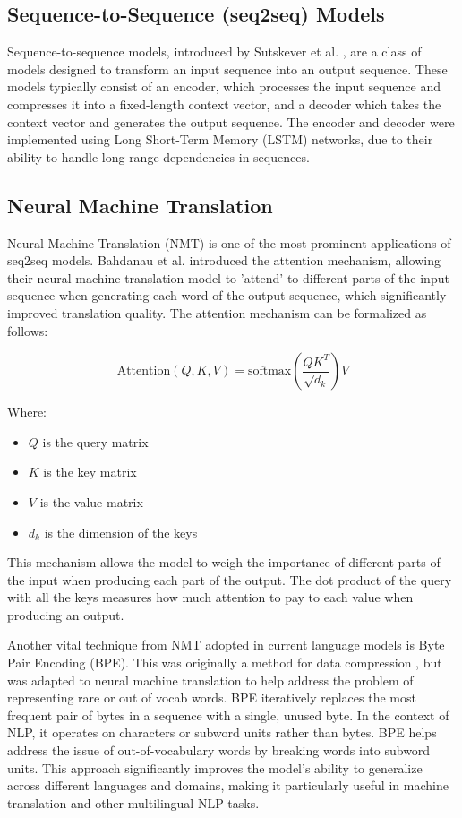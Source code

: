 \documentclass[a4paper, oneside]{discothesis}
\begin{document}
\subsection{Sequence-to-Sequence (seq2seq) Models}
Sequence-to-sequence models, introduced by Sutskever et al. \cite{sutskever2014sequence}, are a class of models designed to transform an input sequence into an output sequence. 
These models typically consist of an encoder, which processes the input sequence and compresses it into a fixed-length context vector, and a decoder which takes the context vector and generates the output sequence.
The encoder and decoder were implemented using Long Short-Term Memory (LSTM) networks, due to their ability to handle long-range dependencies in sequences.

\subsection{Neural Machine Translation}
Neural Machine Translation (NMT) is one of the most prominent applications of seq2seq models.
Bahdanau et al. \cite{bahdanau2014neural} introduced the attention mechanism, allowing their neural machine translation model to 'attend' to different parts of the input sequence when generating each word of the output sequence, which significantly improved translation quality.
The attention mechanism can be formalized as follows:

\begin{equation}
\text{Attention}(Q, K, V) = \text{softmax}\left(\frac{QK^T}{\sqrt{d_k}}\right)V
\end{equation}

Where:
\begin{itemize}
    \item $Q$ is the query matrix
    \item $K$ is the key matrix
    \item $V$ is the value matrix
    \item $d_k$ is the dimension of the keys
\end{itemize}

This mechanism allows the model to weigh the importance of different parts of the input when producing each part of the output. The dot product of the query with all the keys measures how much attention to pay to each value when producing an output.

Another vital technique from NMT adopted in current language models is Byte Pair Encoding (BPE). This was originally a method for data compression \cite{PhilipGage1994}, but was adapted to neural machine translation to help address the problem of representing rare or out of vocab words\cite{sennrich2015neural}. 
BPE iteratively replaces the most frequent pair of bytes in a sequence with a single, unused byte. In the context of NLP, it operates on characters or subword units rather than bytes. BPE helps address the issue of out-of-vocabulary words by breaking words into subword units. 
This approach significantly improves the model's ability to generalize across different languages and domains, making it particularly useful in machine translation and other multilingual NLP tasks.
\end{document}
